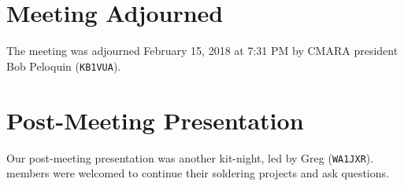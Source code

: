 \documentclass[10pt,letterpaper]{article}
\begin{document}
\section{Meeting Adjourned}
The meeting was adjourned February 15, 2018 at 7:31 PM by CMARA president Bob Peloquin (\texttt{KB1VUA}).

\section{Post-Meeting Presentation}
Our post-meeting presentation was another kit-night, led by Greg (\texttt{WA1JXR}). members were welcomed to continue their soldering projects and ask questions.
\end{document}
